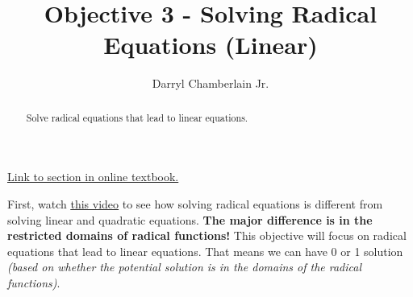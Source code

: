 \documentclass{ximera}
\author{Darryl Chamberlain Jr.}
\title{Objective 3 - Solving Radical Equations (Linear)}
\begin{document}
\begin{abstract}
Solve radical equations that lead to linear equations.
\end{abstract}
\maketitle

\href{https://cnx.org/contents/mwjClAV_@8.1:uI1As6DV@15/Other-Types-of-Equations}{Link to section in online textbook.}


First, watch 
\underline{\href{https://mediasite.video.ufl.edu/Mediasite/Play/631ca9eb67f349698705032a7c42906d1d}{this video}} to see how solving radical equations is different from solving linear and quadratic equations. \textbf{The major difference is in the restricted domains of radical functions!} This objective will focus on radical equations that lead to linear equations.  That means we can have 0 or 1 solution \textit{(based on whether the potential solution is in the domains of the radical functions)}. 
\end{document}
